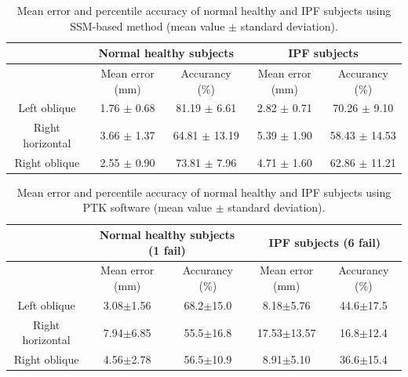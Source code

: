 \documentclass[]{spie}  %
\begin{document}
{\begin{table}[htbp]
\centering
\caption{Mean error and percentile accuracy of normal healthy and IPF subjects using SSM-based method (mean value $\pm$ standard deviation).}
\label{tab:SSMQuantitativeResult}
\begin{tabular}{| c | c | c | c | c |}
\hline
~ & \multicolumn{2}{|c|}{\bf{Normal healthy subjects}} & \multicolumn{2}{|c|}{\bf{IPF subjects}}\\ 
\hline
~ & Mean error (mm) & Accurancy (\%) & Mean error (mm) & Accurancy (\%)\\	
\hline
Left oblique & 1.76 $\pm$ 0.68 & 81.19 $\pm$ 6.61 & 2.82 $\pm$ 0.71 & 70.26 $\pm$ 9.10\\
\hline
Right horizontal & 3.66 $\pm$ 1.37 & 64.81 $\pm$ 13.19 & 5.39 $\pm$ 1.90 & 58.43 $\pm$ 14.53\\
\hline
Right oblique & 2.55 $\pm$ 0.90 & 73.81 $\pm$ 7.96 & 4.71 $\pm$ 1.60 & 62.86 $\pm$ 11.21\\						
\hline
\end{tabular}
\end{table}

\begin{table}[htbp]
\centering
\caption{Mean error and percentile accuracy of normal healthy and IPF subjects using PTK software (mean value $\pm$ standard deviation).}
\label{tab:PTKQuantitativeResult}
\begin{tabular}{| c | c | c | c | c |}
\hline
~ & \multicolumn{2}{|c|}{\bf{Normal healthy subjects (1 fail)}} & \multicolumn{2}{|c|}{\bf{IPF subjects (6 fail)}}\\ 
\hline
~ & Mean error (mm) & Accurancy (\%) & Mean error (mm) & Accurancy (\%)\\	
\hline
Left oblique & 3.08$\pm$1.56 & 68.2$\pm$15.0 & 8.18$\pm$5.76 & 44.6$\pm$17.5\\
\hline
Right horizontal & 7.94$\pm$6.85 & 55.5$\pm$16.8 & 17.53$\pm$13.57 & 16.8$\pm$12.4\\
\hline
Right oblique & 4.56$\pm$2.78 & 56.5$\pm$10.9 & 8.91$\pm$5.10 & 36.6$\pm$15.4\\						
\hline
\end{tabular}
\end{table}

}
\end{document}

